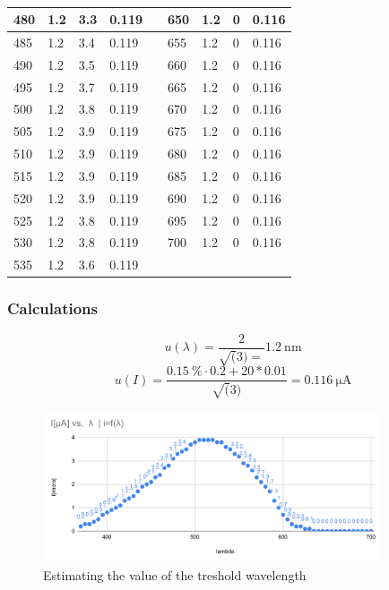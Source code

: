 \begin{table}[H]
\begin{tabular}{l|l|l|l|l|l|l|l|l}
        480 & 1.2 & 3.3 & 0.119 && 650 & 1.2 & 0 & 0.116 \\ \hline
        485 & 1.2 & 3.4 & 0.119 && 655 & 1.2 & 0 & 0.116 \\ \hline
        490 & 1.2 & 3.5 & 0.119 && 660 & 1.2 & 0 & 0.116 \\ \hline
        495 & 1.2 & 3.7 & 0.119 && 665 & 1.2 & 0 & 0.116 \\ \hline
        500 & 1.2 & 3.8 & 0.119 && 670 & 1.2 & 0 & 0.116 \\ \hline
        505 & 1.2 & 3.9 & 0.119 && 675 & 1.2 & 0 & 0.116 \\ \hline
        510 & 1.2 & 3.9 & 0.119 && 680 & 1.2 & 0 & 0.116 \\ \hline
        515 & 1.2 & 3.9 & 0.119 && 685 & 1.2 & 0 & 0.116 \\ \hline
        520 & 1.2 & 3.9 & 0.119 && 690 & 1.2 & 0 & 0.116 \\ \hline
        525 & 1.2 & 3.8 & 0.119 && 695 & 1.2 & 0 & 0.116 \\ \hline
        530 & 1.2 & 3.8 & 0.119 && 700 & 1.2 & 0 & 0.116 \\ \hline
        535 & 1.2 & 3.6 & 0.119 && ~ & & & 
    \end{tabular}
    \caption{}
\end{table}

\subsubsection*{Calculations }

\begin{equation}
	u(\lambda) = \frac{2}{\sqrt(3) =} \SI{1.2}{\nano\meter}
\end{equation}
\begin{equation}
	u(I) = \frac{\SI{0.15}{\percent} \cdot 0.2 + 20 * 0.01}{\sqrt(3)} = \SI{0.116}{\micro\ampere}
\end{equation}

\begin{figure}[H]
	\centering
	\includegraphics[width=10cm]{schematics/thresholdWavelenght.pdf}
	\caption{Estimating the value of the treshold wavelength}
\end{figure}

